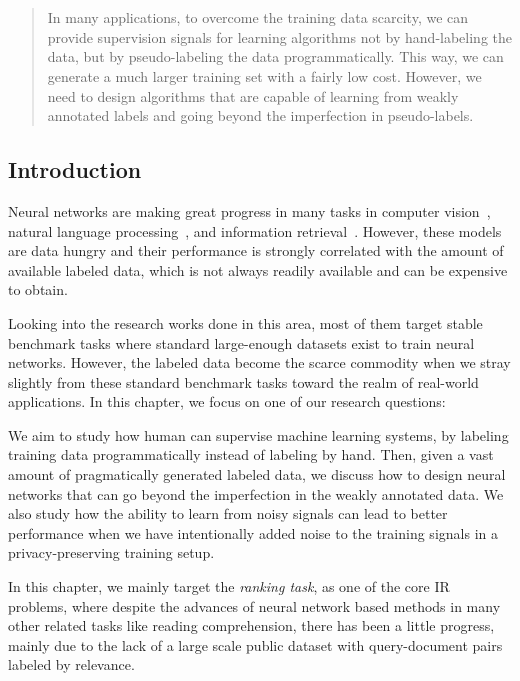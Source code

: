 \chapter{}
\label{chap:4}
%
\begin{quote}
In many applications, to overcome the training data scarcity, we can provide supervision signals for learning algorithms not by hand-labeling the data, but by pseudo-labeling the data programmatically. This way, we can generate a much larger training set with a fairly low cost. However, we need to design algorithms that are capable of learning from weakly annotated labels and going beyond the imperfection in pseudo-labels. 
\end{quote}
%
\section{Introduction}
Neural networks are making great progress in many tasks in computer vision~\citep{krizhevsky2012imagenet}, natural language processing~\citep{collobert2008unified}, and information retrieval~\citep{welling2005exponential}. However, these models are data hungry and their performance is strongly correlated with the amount of available labeled data, which is not always readily available and can be expensive to obtain. 

Looking into the research works done in this area, most of them target stable benchmark tasks where standard large-enough datasets exist to train neural networks. However, the labeled data become the scarce commodity when we stray slightly from these standard benchmark tasks toward the realm of real-world applications. In this chapter, we focus on one of our research questions:

We aim to study how human can supervise machine learning systems, by labeling training data programmatically instead of labeling by hand. Then, given a vast amount of pragmatically generated labeled data, we discuss how to design neural networks that can go beyond the imperfection in the weakly annotated data. We also study how the ability to learn from noisy signals can lead to better performance when we have intentionally added noise to the training signals in a privacy-preserving training setup.

\medskip
In this chapter, we mainly target the \emph{ranking task}, as one of the core IR problems, where despite the advances of neural network based methods in many other related tasks like reading comprehension, there has been a little progress, mainly due to the lack of a large scale public dataset with query-document pairs labeled by relevance. 

